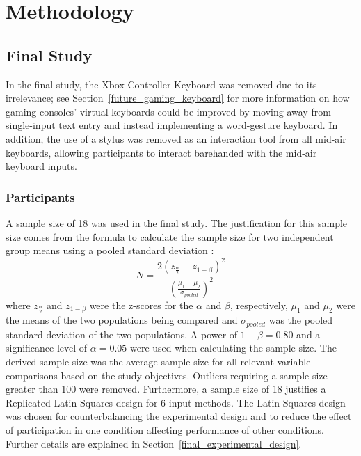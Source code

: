 \chapter{Methodology} \label{methodology}

\section{Final Study} \label{final_study}
In the final study, the Xbox Controller Keyboard was removed due to its irrelevance; see Section~\ref{future_gaming_keyboard} for more information on how gaming consoles' virtual keyboards could be improved by moving away from single-input text entry and instead implementing a word-gesture keyboard. In addition, the use of a stylus was removed as an interaction tool from all mid-air keyboards, allowing participants to interact barehanded with the mid-air keyboard inputs.

\subsection{Participants} \label{final_participants}
A sample size of 18 was used in the final study. The justification for this sample size comes from the formula to calculate the sample size for two independent group means using a pooled standard deviation \cite{ref_sample_size}:
\begin{equation}
N = \frac{2(z_{\frac{\alpha}{2}} + z_{1-\beta})^2}{(\frac{\mu_1 - \mu_2}{\sigma_{pooled}})^2}
\end{equation}
where $z_{\frac{\alpha}{2}}$ and $z_{1-\beta}$ were the z-scores for the $\alpha$ and $\beta$, respectively, $\mu_1$ and $\mu_2$ were the means of the two populations being compared and $\sigma_{pooled}$ was the pooled standard deviation of the two populations. A power of $1-\beta = 0.80$ and a significance level of $\alpha = 0.05$ were used when calculating the sample size. The derived sample size was the average sample size for all relevant variable comparisons based on the study objectives. Outliers requiring a sample size greater than 100 were removed. Furthermore, a sample size of 18 justifies a Replicated Latin Squares design for 6 input methods. The Latin Squares design was chosen for counterbalancing the experimental design and to reduce the effect of participation in one condition affecting performance of other conditions. Further details are explained in Section~\ref{final_experimental_design}.

